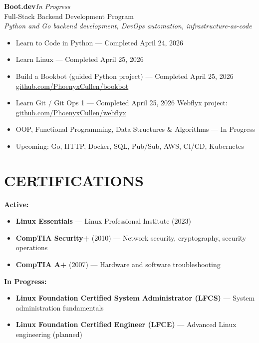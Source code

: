 \documentclass[9pt,letterpaper]{extarticle}
\begin{document}
\vspace{4pt}
\noindent\textbf{Boot.dev}\hfill\textit{In Progress}\\
Full-Stack Backend Development Program\\
\textit{Python and Go backend development, DevOps automation, infrastructure-as-code}
\begin{itemize}
  \item Learn to Code in Python --- Completed April 24, 2026
  \item Learn Linux --- Completed April 25, 2026
  \item Build a Bookbot (guided Python project) --- Completed April 25, 2026 \textbar{} \href{https://github.com/PhoenyxCullen/bookbot}{github.com/PhoenyxCullen/bookbot}
  \item Learn Git / Git Ops 1 --- Completed April 25, 2026 \textbar{} Webflyx project: \href{https://github.com/PhoenyxCullen/webflyx}{github.com/PhoenyxCullen/webflyx}
  \item OOP, Functional Programming, Data Structures \& Algorithms --- In Progress
  \item Upcoming: Go, HTTP, Docker, SQL, Pub/Sub, AWS, CI/CD, Kubernetes
\end{itemize}

\section*{CERTIFICATIONS}

\textbf{Active:}
\begin{itemize}
  \item \textbf{Linux Essentials} --- Linux Professional Institute (2023)
  \item \textbf{CompTIA Security+} (2010) --- Network security, cryptography, security operations
  \item \textbf{CompTIA A+} (2007) --- Hardware and software troubleshooting
\end{itemize}

\textbf{In Progress:}
\begin{itemize}
  \item \textbf{Linux Foundation Certified System Administrator (LFCS)} --- System administration fundamentals
  \item \textbf{Linux Foundation Certified Engineer (LFCE)} --- Advanced Linux engineering (planned)
\end{itemize}
\end{document}
